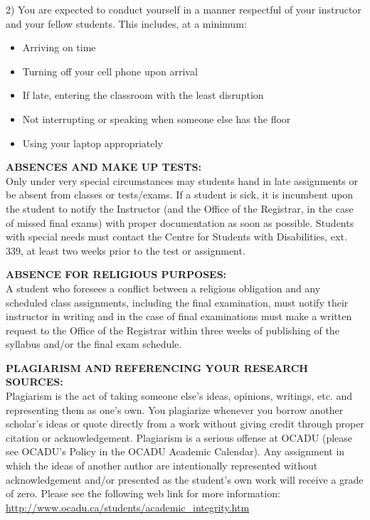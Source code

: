 \documentclass[10pt]{article}
\begin{document}
2) You are expected to conduct yourself in a manner respectful of your instructor and your fellow students. This includes, at a minimum:
\begin{itemize}[noitemsep,nolistsep]
	\item Arriving on time
	\item Turning off your cell phone upon arrival
	\item If late, entering the classroom with the least disruption
	\item Not interrupting or speaking when someone else has the floor
	\item Using your laptop appropriately
\end{itemize}

\textbf{ABSENCES AND MAKE UP TESTS:}\\
Only under very special circumstances may students hand in late assignments or be absent from classes or tests/exams. If a student is sick, it is incumbent upon the student to notify the Instructor (and the Office of the Registrar, in the case of missed final exams) with proper documentation as soon as possible.  Students with special needs must contact the Centre for Students with Disabilities, ext. 339, at least two weeks prior to the test or assignment.

\textbf{ABSENCE FOR RELIGIOUS PURPOSES:}\\
A student who foresees a conflict between a religious obligation and any scheduled class assignments, including the final examination, must notify their instructor in writing and in the case of final examinations must make a written request to the Office of the Registrar within three weeks of publishing of the syllabus and/or the final exam schedule. 

\textbf{PLAGIARISM AND REFERENCING YOUR RESEARCH SOURCES:}\\
Plagiarism is the act of taking someone else's ideas, opinions, writings, etc. and representing them as one's own. You plagiarize whenever you borrow another scholar's ideas or quote directly from a work without giving credit through proper citation or acknowledgement. Plagiarism is a serious offense at OCADU (please see OCADU's Policy in the OCADU Academic Calendar). Any assignment in which the ideas of another author are intentionally represented without acknowledgement and/or presented as the student's own work will receive a grade of zero. Please see the following web link for more information:\\
\url{http://www.ocadu.ca/students/academic_integrity.htm}
\end{document}
